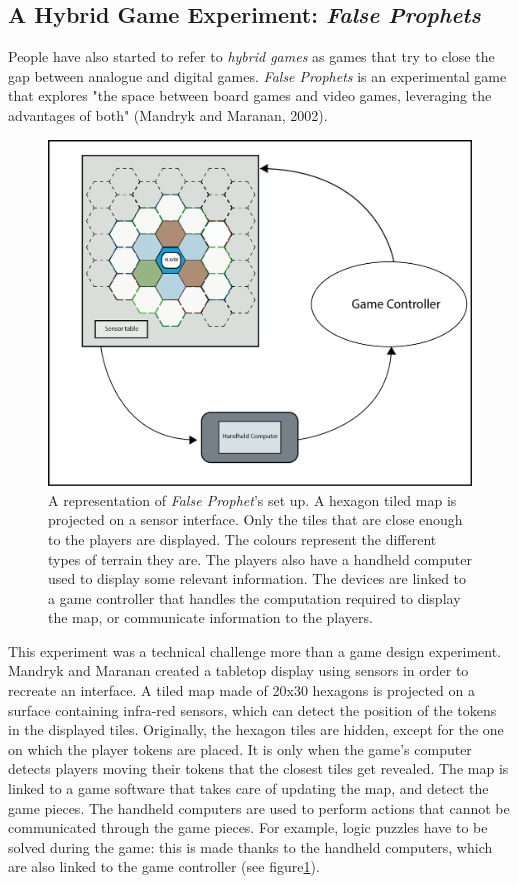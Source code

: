 \subsection{A Hybrid Game Experiment: \textit{False Prophets}}
People have also started to refer to \textit{hybrid games} as games that try to close the gap between analogue and digital games. \textit{False Prophets} is an experimental game that explores "the space between board games and video games, leveraging the advantages of both" (Mandryk and Maranan, 2002)\cite{art:prophets}. 

\begin{figure}[h]
    \centering
    \includegraphics[scale=1]{Images/f_p_fig.png}
    \caption{A representation of \textit{False Prophet}'s set up. A hexagon tiled map is projected on a sensor interface. Only the tiles that are close enough to the players are displayed. The colours represent the different types of terrain they are. The players also have a handheld computer used to display some relevant information. The devices are linked to a game controller that handles the computation required to display the map, or communicate information to the players.}
    \label{fig:falseprophet}
\end{figure}

This experiment was a technical challenge more than a game design experiment. Mandryk and Maranan created a tabletop display using sensors in order to recreate an interface. A tiled map made of 20x30 hexagons is projected on a surface containing infra-red sensors, which can detect the position of the tokens in the displayed tiles. Originally, the hexagon tiles are hidden, except for the one on which the player tokens are placed. It is only when the game's computer detects players moving their tokens that the closest tiles get revealed. The map is linked to a game software that takes care of updating the map, and detect the game pieces. The handheld computers are used to perform actions that cannot be communicated through the game pieces. For example, logic puzzles have to be solved during the game: this is made thanks to the handheld computers, which are also linked to the game controller (see figure\ref{fig:falseprophet}). 

